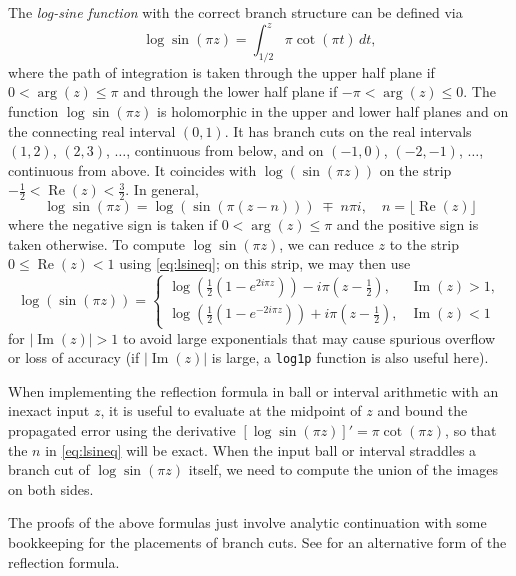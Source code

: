 \documentclass[reqno]{amsart}
\theoremstyle{definition}
\begin{document}
The \emph{log-sine function} with the correct
branch structure can be defined via
\begin{equation}
\log \sin(\pi z) = \int_{1/2}^z \pi \cot(\pi t) \, dt,
\end{equation}
where the path of integration is taken through the upper half plane
if $0 < \arg(z) \le \pi$ and through the lower half plane
if $-\pi < \arg(z) \le 0$.
The function $\log \sin(\pi z)$ is holomorphic
in the upper and lower half planes and
on the connecting real interval $(0,1)$.
It has branch cuts on the real intervals $(1, 2)$, $(2, 3)$, $\ldots$,
continuous from below, and on $(-1,0)$, $(-2,-1)$, $\ldots$, continuous from
above.
It coincides with $\log(\sin(\pi z))$
on the strip $-\tfrac{1}{2} < \operatorname{Re}(z) < \tfrac{3}{2}$.
In general,
\begin{equation}
\log \sin(\pi z) = \log(\sin(\pi(z-n))) \; \mp \; n \pi i, \quad n = \lfloor \operatorname{Re}(z) \rfloor
\label{eq:lsineq}
\end{equation}
where the negative sign is taken if $0 < \arg(z) \le \pi$
and the positive sign is taken otherwise.
To compute $\log \sin(\pi z)$, we can reduce
$z$ to the strip $0 \le \operatorname{Re}(z) < 1$
using \eqref{eq:lsineq}; on this strip, we may then use
\begin{equation}
\log(\sin(\pi z)) =
\begin{cases}
\log(\tfrac{1}{2}(1-e^{2i\pi z})) - i \pi (z-\tfrac{1}{2}), & \operatorname{Im}(z) > 1, \\
\log(\tfrac{1}{2}(1-e^{-2i\pi z})) + i \pi (z-\tfrac{1}{2}), & \operatorname{Im}(z) < 1
\end{cases}
\end{equation}
for $|\operatorname{Im}(z)| > 1$ to avoid large exponentials
that may cause spurious overflow or loss of accuracy
(if $|\operatorname{Im}(z)|$ is large, a \texttt{log1p} function is also useful here).

When implementing the reflection formula in ball or interval arithmetic
with an inexact input $z$,
it is useful to evaluate at the midpoint of $z$
and bound the propagated error using the derivative $[\log \sin(\pi z)]' = \pi \cot(\pi z)$,
so that the $n$ in \eqref{eq:lsineq} will be exact.
When the input ball or interval straddles a branch cut of $\log \sin(\pi z)$ itself, we need to compute the union of the
images on both sides.

The proofs of the above formulas just involve analytic continuation
with some bookkeeping for the placements of branch cuts.
See \cite[Proposition 3.1]{Hare1997} for an alternative form of the reflection formula.
\end{document}
